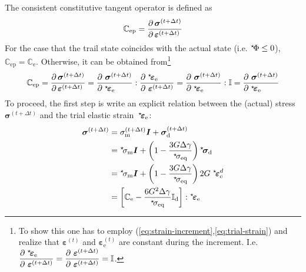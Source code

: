 \documentclass[times,namecite]{goose-article}
\newcommand\leftstar[1]{\hspace*{-.3em}~^\star\!#1}
\begin{document}
The consistent constitutive tangent operator is defined as
\begin{equation}
  \mathbb{C}_\mathrm{ep}
  =
  \frac{
    \partial\, \bm{\sigma}^{(t+\Delta t)} \hfill
  }{
    \partial\, \bm{\varepsilon}^{(t+\Delta t)} \hfill
  }
\end{equation}
For the case that the trail state coincides with the actual state (i.e. $\leftstar{\Phi} \leq 0$), $\mathbb{C}_\mathrm{ep} = \mathbb{C}_\mathrm{e}$. Otherwise, it can be obtained from\footnote{To show this one has to employ (\ref{eq:strain-increment},\ref{eq:trial-strain}) and realize that $\bm{\varepsilon}^{(t)}$ and $\bm{\varepsilon}_\mathrm{e}^{(t)}$ are constant during the increment. I.e.\ $\displaystyle \frac{\partial \; \leftstar{\bm{\varepsilon}}_\mathrm{e} \hfill}{\partial ~\bm{\varepsilon}^{(t+\Delta t)} \hfill} = \displaystyle \frac{\partial ~\bm{\varepsilon}^{(t+\Delta t)} \hfill}{\partial ~\bm{\varepsilon}^{(t+\Delta t)} \hfill} = \mathbb{I}$.}
\begin{equation}
  \mathbb{C}_\mathrm{ep}
  =
  \frac{
    \partial\, \bm{\sigma}^{(t+\Delta t)} \hfill
  }{
    \partial\, \bm{\varepsilon}^{(t+\Delta t)} \hfill
  }
  =
  \frac{
    \partial~  \bm{\sigma}^{(t+\Delta t)} \hfill
  }{
    \partial\; \leftstar{\bm{\varepsilon}}_\mathrm{e} \hfill
  }
  :
  \frac{
    \partial\; \leftstar{\bm{\varepsilon}}_\mathrm{e} \hfill
  }{
    \partial~  \bm{\varepsilon}^{(t+\Delta t)}
  }
  =
  \frac{
    \partial~  \bm{\sigma}^{(t+\Delta t)} \hfill
  }{
    \partial\; \leftstar{\bm{\varepsilon}}_\mathrm{e} \hfill
  }
  :
  \mathbb{I}
  =
  \frac{
    \partial ~\bm{\sigma}^{(t+\Delta t)} \hfill
  }{
    \partial \;\leftstar{\bm{\varepsilon}}_\mathrm{e} \hfill
  }
\end{equation}
To proceed, the first step is write an explicit relation between the (actual) stress $\bm{\sigma}^{(t+\Delta t)}$ and the trial elastic strain~$\leftstar{\bm{\varepsilon}}_\mathrm{e}$:
\begin{align}
  \bm{\sigma}^{(t+\Delta t)}
  &= \sigma_\mathrm{m}^{(t+\Delta t)} \bm{I} + \bm{\sigma}_\mathrm{d}^{(t+\Delta t)}
  \\
  &= \leftstar{\sigma}_\mathrm{m} \bm{I} +
  \left( 1 - \frac{3 G \Delta \gamma}{\leftstar{\sigma}_\mathrm{eq}} \right) \leftstar{\bm{\sigma}}_\mathrm{d}
  \\
  &= \leftstar{\sigma}_\mathrm{m} \bm{I} +
  \left( 1 - \frac{3 G \Delta \gamma}{\leftstar{\sigma}_\mathrm{eq}} \right) 2 G \; \leftstar{\bm{\varepsilon}}_\mathrm{e}^d
  \\
  \label{eq:tangent:stress-strain}
  &= \left[ \mathbb{C}_\mathrm{e} - \frac{6 G^2 \Delta \gamma}{\leftstar{\sigma}_\mathrm{eq}} \mathbb{I}_\mathrm{d} \right] : \leftstar{\bm{\varepsilon}}_\mathrm{e}
\end{align}
\end{document}
